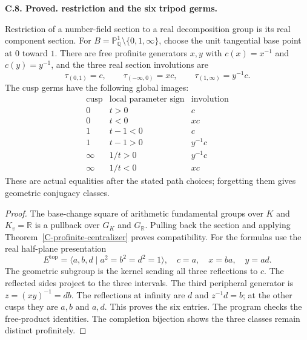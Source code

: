 \documentclass[11pt,oneside]{article}
\makeatletter
\newcounter{statementanchor}
\newenvironment{statement}[3]{%
 \refstepcounter{statementanchor}\def\@currentlabel{#1}%
 \par\addvspace{9pt}\noindent
 \textbf{#1. #2. #3.}\par\nobreak\noindent\ignorespaces
}{\par\addvspace{5pt}}
\makeatother
\begin{document}
\begin{statement}{C.8}{Proved}{restriction and the six tripod germs}
\label{st:C.8}
\label{C-tripod}
Restriction of a number-field section to a real
decomposition group is its real component section.
For $B=\mathbb P^1_{\mathbb Q}\setminus\{0,1,\infty\}$,
choose the unit tangential base point at $0$ toward $1$.
There are free profinite generators $x,y$ with
$c(x)=x^{-1}$ and $c(y)=y^{-1}$, and the three
real section involutions are
\[
 \tau_{(0,1)}=c,\qquad
 \tau_{(-\infty,0)}=xc,\qquad
 \tau_{(1,\infty)}=y^{-1}c .
\]
The cusp germs have the following global images:
\[
\begin{array}{c|c|c}
\text{cusp}&\text{local parameter sign}&\text{involution}\\ \hline
0&t>0&c\\
0&t<0&xc\\
1&t-1<0&c\\
1&t-1>0&y^{-1}c\\
\infty&1/t>0&y^{-1}c\\
\infty&1/t<0&xc
\end{array}
\]
These are actual equalities after the stated
path choices; forgetting them gives geometric
conjugacy classes.
\end{statement}
\begin{proof}
The base-change square of arithmetic fundamental
groups over $K$ and $K_v=\mathbb R$ is a pullback
over $G_K$ and $G_{\mathbb R}$. Pulling back the
section and applying
Theorem~\ref{C-profinite-centralizer} proves compatibility.
For the formulas use the real half-plane presentation
\[
 E^{\mathrm{top}}
 =\langle a,b,d\mid a^2=b^2=d^2=1\rangle,\quad
 c=a,\quad x=ba,\quad y=ad .
\]
The geometric subgroup is the kernel sending all
three reflections to $c$. The reflected sides
project to the three intervals. The third
peripheral generator is $z=(xy)^{-1}=db$.
The reflections at infinity are $d$ and
$z^{-1}d=b$; at the other cusps they are
$a,b$ and $a,d$. This proves the six entries.
The program checks the free-product identities.
The completion bijection shows the three
classes remain distinct profinitely.
\end{proof}
\end{document}
